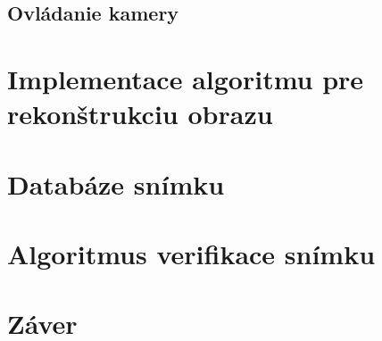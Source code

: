 \documentclass[11pt,a4paper]{article}
\begin{document}
\subsection{Ovládanie kamery}

\section{Implementace algoritmu pre rekonštrukciu obrazu}

\section{Databáze snímku}

\section{Algoritmus verifikace snímku}

\section{Záver}
\end{document}

